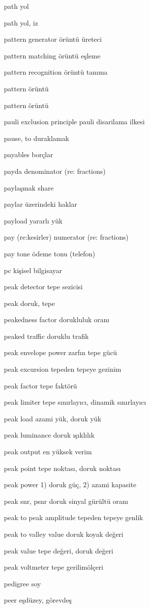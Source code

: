 \documentclass[12pt,fleqn]{article}\usepackage{../../common}
\begin{document}
path yol

path yol, iz

pattern generator örüntü üreteci

pattern matching örüntü eşleme

pattern recognition örüntü tanıma

pattern örüntü

pattern örüntü

pauli exclusion principle pauli disarilama ilkesi

pause, to duraklamak

payables borçlar

payda denominator (re: fractions)

paylaşmak share

paylar üzerindeki haklar

payload yararlı yük

pay (re:kesirler) numerator (re: fractions)

pay tone ödeme tonu (telefon)

pc kişisel bilgisayar

peak detector tepe sezicisi

peak doruk, tepe

peakedness factor dorukluluk oranı

peaked traffic doruklu trafik

peak envelope power zarfın tepe gücü

peak excursion tepeden tepeye gezinim

peak factor tepe faktörü

peak limiter tepe sınırlayıcı, dinamik sınırlayıcı

peak load azami yük, doruk yük

peak luminance doruk ışıklılık

peak output en yüksek verim

peak point tepe noktası, doruk noktası

peak power 1) doruk güç, 2) azami kapasite

peak snr, psnr doruk sinyal gürültü oranı

peak to peak amplitude tepeden tepeye genlik

peak to valley value doruk koyak değeri

peak value tepe değeri, doruk değeri

peak voltmeter tepe gerilimölçeri

pedigree soy

peer eşdüzey, görevdeş
\end{document}
